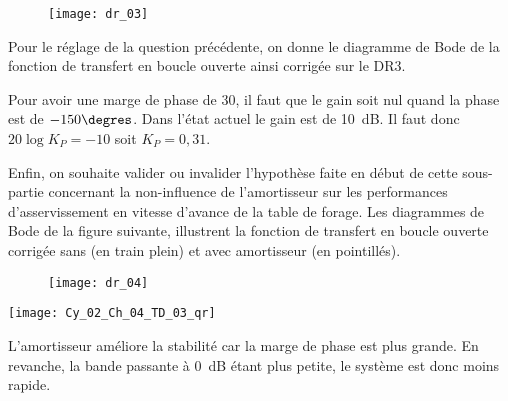 \else
\fi


\ifprof
\else
\begin{figure}[!h]
\texttt{[image: dr\_03]}
\end{figure}

 
Pour le réglage de la question précédente, on donne le diagramme de Bode de la fonction de 
transfert en boucle ouverte ainsi corrigée sur le DR3. 
\fi

\ifprof
\begin{corrige}
Pour avoir une marge de phase de 30\degres, il faut que le gain soit nul quand la phase est de $-150\degres$. Dans l'état actuel le gain est de \SI{10}{dB}. Il faut donc $20\log K_P = -10$ soit $K_P = 0,31$.
\end{corrige}
\else
\fi
 
 
\ifprof
\else
Enfin, on souhaite valider ou invalider l’hypothèse faite en début de cette sous-partie concernant la 
non-influence de l’amortisseur sur les performances d’asservissement en vitesse d’avance de la 
table de forage. Les diagrammes de Bode de la figure suivante, 
illustrent la fonction de transfert en boucle ouverte corrigée sans (en train plein) et avec amortisseur 
(en pointillés). 
 
 
\begin{figure}[!h]
\texttt{[image: dr\_04]}
\end{figure}
\fi
 
\ifprof
\else
\begin{marginfigure}
\centering
\texttt{[image: Cy\_02\_Ch\_04\_TD\_03\_qr]}
\end{marginfigure}
\fi

\ifprof
\begin{corrige}
L'amortisseur améliore la stabilité car la marge de phase est plus grande. En revanche, la bande passante à \SI{0}{dB} étant plus petite, le système est donc moins rapide.
\end{corrige}
\else
\fi





